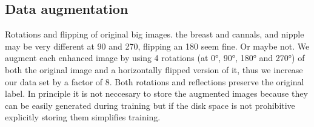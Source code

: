 \subsection{Data augmentation}
Rotations and flipping of original big images. the breast and cannals, and nipple may be very different at 90 and 270, flipping an 180 seem fine. Or maybe not.
We augment each enhanced image by using 4 rotations (at 0°, 90°, 180° and 270°) of both the original image and a horizontally flipped version of it, thus we increase our data set by a factor of 8. Both rotations and reflections preserve the original label. In principle it is not neccesary to store the augmented images because they can be easily generated during training but if the disk space is not prohibitive explicitly storing them simplifies training.

